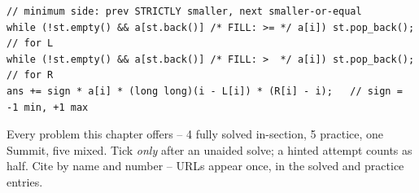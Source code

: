 \begin{lstlisting}[caption={Drill 5 -- the Summit contribution (from \coderef{c26-summit})}]
// minimum side: prev STRICTLY smaller, next smaller-or-equal
while (!st.empty() && a[st.back()] /* FILL: >= */ a[i]) st.pop_back();   // for L
while (!st.empty() && a[st.back()] /* FILL: >  */ a[i]) st.pop_back();   // for R
ans += sign * a[i] * (long long)(i - L[i]) * (R[i] - i);   // sign = -1 min, +1 max
\end{lstlisting}


Every problem this chapter offers -- 4 fully solved in-section, 5 practice, one Summit, five mixed.
Tick \emph{only} after an unaided solve; a hinted attempt counts as half. Cite by name and number --
URLs appear once, in the solved and practice entries.

